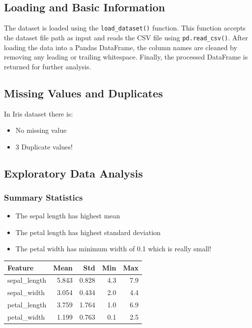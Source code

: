 \documentclass[12pt,a4paper]{article}
\begin{document}

\subsection{Loading and Basic Information}
The dataset is loaded using the \texttt{load\_dataset()} function. This function accepts the dataset file path as input and reads the CSV file using \texttt{pd.read\_csv()}. After loading the data into a Pandas DataFrame, the column names are cleaned by removing any leading or trailing whitespace. Finally, the processed DataFrame is returned for further analysis.

\subsection{Missing Values and Duplicates}
In Iris dataset there is: 
\begin{itemize}
    \item No missing value
    \item 3 Duplicate values!
\end{itemize}

\subsection{Exploratory Data Analysis}

\subsubsection{Summary Statistics}
\begin{itemize}
    \item The sepal length has highest mean
    \item The petal length has highest standard deviation
    \item The petal width has minimum width of 0.1 which is really small!
\end{itemize}

\begin{longtable}{|l|r|r|r|r|}
\hline
\textbf{Feature} & \textbf{Mean} & \textbf{Std} & \textbf{Min} & \textbf{Max} \\ \hline
sepal\_length & 5.843 & 0.828 & 4.3 & 7.9 \\ \hline
sepal\_width  & 3.054 & 0.434 & 2.0 & 4.4 \\ \hline
petal\_length & 3.759 & 1.764 & 1.0 & 6.9 \\ \hline
petal\_width  & 1.199 & 0.763 & 0.1 & 2.5 \\ \hline
\end{longtable}
\end{document}
